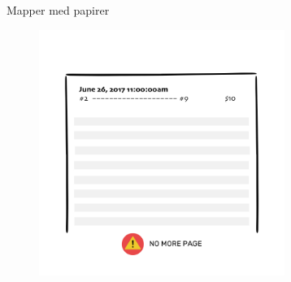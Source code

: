 \documentclass[usenames, dvipsnames]{beamer}
\begin{document}
  \begin{frame}{Mapper med papirer}
    \begin{figure}[ht!]
    \centering
    \includegraphics[width=80mm]{images/all_people_page_filled.png}
    \end{figure}
  \end{frame}
\end{document}
